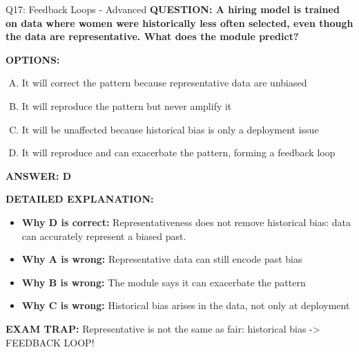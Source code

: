 \documentclass[8pt]{beamer}
\begin{document}
\begin{frame}[shrink=6]{Q17: Feedback Loops - Advanced}
\fontsize{6.5}{7.5}\selectfont
\textbf{QUESTION: A hiring model is trained on data where women were historically less often selected, even though the data are representative. What does the module predict?}

\vspace{0.1cm}
\textbf{OPTIONS:}
\begin{enumerate}[A.]
\item It will correct the pattern because representative data are unbiased
\item It will reproduce the pattern but never amplify it
\item It will be unaffected because historical bias is only a deployment issue
\item It will reproduce and can exacerbate the pattern, forming a feedback loop
\end{enumerate}

\vspace{0.1cm}
\textcolor{myblue}{\textbf{ANSWER: D}}

\vspace{0.1cm}
\textbf{DETAILED EXPLANATION:}
\begin{itemize}
\item \textbf{Why D is correct:} Representativeness does not remove historical bias: data can accurately represent a biased past.
\item \textbf{Why A is wrong:} Representative data can still encode past bias
\item \textbf{Why B is wrong:} The module says it can exacerbate the pattern
\item \textbf{Why C is wrong:} Historical bias arises in the data, not only at deployment
\end{itemize}

\textcolor{myred}{\textbf{EXAM TRAP:}} Representative is not the same as fair: historical bias -> FEEDBACK LOOP!
\end{frame}
\end{document}
